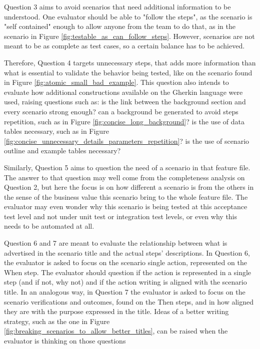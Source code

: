 Question 3 aims to avoid scenarios that need additional information to be understood. One evaluator should be able to "follow the steps", as the scenario is "self contained" enough to allow anyone from the team to do that, as in the scenario in Figure \ref{fig:testable_as_can_follow_steps}. However, scenarios are not meant to be as complete as test cases, so a certain balance has to be achieved. 

Therefore, Question 4 targets unnecessary steps, that adds more information than what is essential to validate the behavior being tested, like on the scenario found in Figure \ref{fig:atomic_small_bad_example}. This question also intends to evaluate how additional constructions available on the Gherkin language were used, raising questions such as: is the link between the background section and every scenario strong enough? can a background be generated to avoid steps repetition, such as in Figure \ref{fig:concise_long_background}? is the use of data tables necessary, such as in Figure \ref{fig:concise_unnecessary_details_parameters_repetition}? is the use of scenario outline and example tables necessary? 

Similarly, Question 5 aims to question the need of a scenario in that feature file. The answer to that question may well come from the completeness analysis on Question 2, but here the focus is on how different a scenario is from the others in the sense of the business value this scenario bring to the whole feature file. The evaluator may even wonder why this scenario is being tested at this acceptance test level and not under unit test or integration test levels, or even why this needs to be automated at all.

Question 6 and 7 are meant to evaluate the relationship between what is advertised in the scenario title and the actual steps' descriptions. In Question 6, the evaluator is asked to focus on the scenario single action, represented on the When step. The evaluator should question if the action is represented in a single step (and if not, why not) and if the action writing is aligned with the scenario title. In an analogous way, in Question 7 the evaluator is asked to focus on the scenario verifications and outcomes, found on the Then steps, and in how aligned they are with the purpose expressed in the title. Ideas of a better writing strategy, such as the one in Figure \ref{fig:breaking_scenarios_to_allow_better_titles}, can be raised when the evaluator is thinking on those questions

